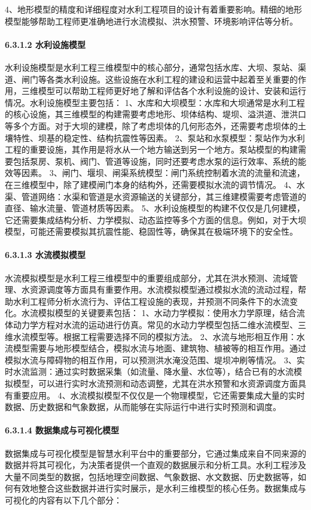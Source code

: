 4、地形模型的精度和详细程度对水利工程项目的设计有着重要影响。精细的地形模型能够帮助工程师更准确地进行水流模拟、洪水预警、环境影响评估等分析。 \paragraph{6.3.1.2 水利设施模型}\label{ux6c34ux5229ux8bbeux65bdux6a21ux578b} 水利设施模型是水利工程三维模型中的核心部分，通常包括水库、大坝、泵站、渠道、闸门等各类水利设施。这些设施在水利工程的建设和运营中起着至关重要的作用，三维模型可以帮助工程师更好地了解和评估各个水利设施的设计、安装和运行情况。水利设施模型主要包括： 1、水库和大坝模型：水库和大坝通常是水利工程的核心设施，其三维模型的构建需要考虑地形、坝体结构、堤坝、溢洪道、泄洪口等多个方面。对于大坝的建模，除了考虑坝体的几何形态外，还需要考虑坝体的土壤特性、坝基的稳定性、结构抗震性等因素。 2、泵站和水泵模型：泵站作为水利工程的重要设施，其作用是将水从一个地方输送到另一个地方。泵站模型的构建需要包括泵房、泵机、阀门、管道等设施，同时还要考虑水泵的运行效率、系统的能效等因素。 3、闸门、堰坝、闸渠系统模型：闸门系统控制着水流的流量和流速，在三维模型中，除了建模闸门本身的结构外，还需要模拟水流的调节情况。 4、水渠、管道网络：水渠和管道是水资源输送的关键部分，其三维建模需要考虑管道的直径、输水流量、管道材质等因素。 5、水利设施模型的构建不仅仅是几何建模，它还需要集成结构分析、力学模拟、动态监控等多个方面的信息。例如，对于大坝模型，可能还需要模拟其抗震性能、稳固性等，确保其在极端环境下的安全性。 \paragraph{6.3.1.3 水流模拟模型}\label{ux6c34ux6d41ux6a21ux62dfux6a21ux578b} 水流模拟模型是水利工程三维模型中的重要组成部分，尤其在洪水预测、流域管理、水资源调度等方面具有重要作用。水流模拟模型通过模拟水流的流动过程，帮助水利工程师分析水流行为、评估工程设施的表现，并预测不同条件下的水流变化。水流模拟模型的关键要素包括： 1、水动力学模拟：使用水力学原理，结合流体动力学方程对水流的运动进行仿真。常见的水动力学模型包括二维水流模型、三维水流模型等。根据工程需要选择不同的模拟方法。 2、水流与地形相互作用：水流模型需要与地形模型结合，模拟水流与地面、建筑物、植被等的相互作用。通过模拟水流与障碍物的相互作用，可以预测洪水淹没范围、堤坝冲刷等情况。 3、实时水流监测：通过实时数据采集（如流量、降水量、水位等），结合已有的水流模拟模型，可以进行实时水流预测和动态调整，尤其在洪水预警和水资源调度方面具有重要应用。 4、水流模拟模型不仅仅是一个物理模型，它还需要集成大量的实时数据、历史数据和气象数据，从而能够在实际运行中进行实时预测和调度。 \paragraph{6.3.1.4 数据集成与可视化模型}\label{ux6570ux636eux96c6ux6210ux4e0eux53efux89c6ux5316ux6a21ux578b} 数据集成与可视化模型是智慧水利平台中的重要部分，它通过集成来自不同来源的数据并将其可视化，为决策者提供一个直观的数据展示和分析工具。水利工程涉及大量不同类型的数据，包括地理空间数据、气象数据、水文数据、历史数据等，如何有效地整合这些数据并进行实时展示，是水利三维模型的核心任务。数据集成与可视化的内容有以下几个部分： 